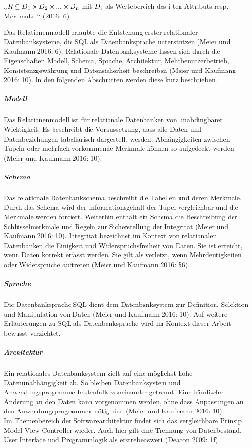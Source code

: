 \documentclass[a4paper]{scrartcl}
\begin{document}
\begin{center}
	„$ R \subseteq D \textsubscript{1} \times D \textsubscript{2} \times ... \times D \textsubscript{n} $
	mit $ D \textsubscript{i} $ als Wertebereich des i-ten Attributs resp. Merkmals. “ (2016: 6)
\end{center}
Das Relationenmodell erlaubte die Entstehung erster relationaler Datenbanksysteme, die SQL als Datenbanksprache unterstützen (Meier und Kaufmann 2016: 6). Relationale Datenbanksysteme lassen sich durch die Eigenschaften Modell, Schema, Sprache, Architektur, Mehrbenutzerbetrieb, Konsistenzgewährung und Datensicherheit beschreiben (Meier und Kaufmann 2016: 10). In den folgenden Abschnitten werden diese kurz beschrieben.

\subparagraph{Modell}
Das Relationenmodell ist für relationale Datenbanken von unabdingbarer Wichtigkeit. Es beschreibt die Voraussetzung, dass alle Daten und Datenbeziehungen tabellarisch dargestellt werden. Abhängigkeiten zwischen Tupeln oder mehrfach vorkommende Merkmale können so aufgedeckt werden (Meier und Kaufmann 2016: 10).

\subparagraph{Schema}
Das relationale Datenbankschema beschreibt die Tabellen und deren Merkmale. Durch das Schema wird der Informationsgehalt der Tupel vergleichbar und die Merkmale werden forciert. Weiterhin enthält ein Schema die Beschreibung der Schlüsselmerkmale und Regeln zur Sicherstellung der Integrität (Meier und Kaufmann 2016: 10). Integrität bezeichnet im Kontext von relationalen Datenbanken die Einigkeit und Widerspruchsfreiheit von Daten. Sie ist erreicht, wenn Daten korrekt erfasst werden. Sie gilt als verletzt, wenn Mehrdeutigkeiten oder Widersprüche auftreten (Meier und Kaufmann 2016: 56).

\subparagraph{Sprache}
Die Datenbanksprache SQL dient dem Datenbanksystem zur Definition, Selektion und Manipulation von Daten (Meier und Kaufmann 2016: 10). Auf weitere Erläuterungen zu SQL als Datenbanksprache wird im Kontext dieser Arbeit bewusst verzichtet.

\subparagraph{Architektur}
Ein relationales Datenbanksystem zielt auf eine möglichst hohe Datenunabhängigkeit ab. So bleiben Datenbanksystem und Anwendungsprogramme bestenfalls voneinander getrennt. Eine händische Änderung an den Daten kann vorgenommen werden, ohne dass Anpassungen an den Anwendungsprogrammen nötig sind (Meier und Kaufmann 2016: 10). \\
Im Themenbereich der Softwarearchitektur findet sich das vergleichbare Prinzip Model-View-Controller wieder. Auch hier gilt eine Trennung von Datenbestand, User Interface und Programmlogik als erstrebenswert (Deacon 2009: 1f). 
\end{document}
